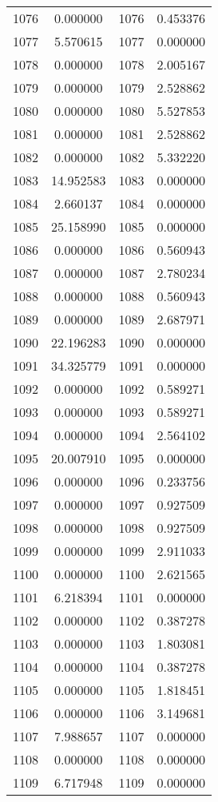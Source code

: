 \documentclass[12pt]{article}
\begin{document}
\begin{longtable}{@{}cccc@{}}
1076 & 0.000000 & 1076 & 0.453376 \\
1077 & 5.570615 & 1077 & 0.000000 \\
1078 & 0.000000 & 1078 & 2.005167 \\
1079 & 0.000000 & 1079 & 2.528862 \\
1080 & 0.000000 & 1080 & 5.527853 \\
1081 & 0.000000 & 1081 & 2.528862 \\
1082 & 0.000000 & 1082 & 5.332220 \\
1083 & 14.952583 & 1083 & 0.000000 \\
1084 & 2.660137 & 1084 & 0.000000 \\
1085 & 25.158990 & 1085 & 0.000000 \\
1086 & 0.000000 & 1086 & 0.560943 \\
1087 & 0.000000 & 1087 & 2.780234 \\
1088 & 0.000000 & 1088 & 0.560943 \\
1089 & 0.000000 & 1089 & 2.687971 \\
1090 & 22.196283 & 1090 & 0.000000 \\
1091 & 34.325779 & 1091 & 0.000000 \\
1092 & 0.000000 & 1092 & 0.589271 \\
1093 & 0.000000 & 1093 & 0.589271 \\
1094 & 0.000000 & 1094 & 2.564102 \\
1095 & 20.007910 & 1095 & 0.000000 \\
1096 & 0.000000 & 1096 & 0.233756 \\
1097 & 0.000000 & 1097 & 0.927509 \\
1098 & 0.000000 & 1098 & 0.927509 \\
1099 & 0.000000 & 1099 & 2.911033 \\
1100 & 0.000000 & 1100 & 2.621565 \\
1101 & 6.218394 & 1101 & 0.000000 \\
1102 & 0.000000 & 1102 & 0.387278 \\
1103 & 0.000000 & 1103 & 1.803081 \\
1104 & 0.000000 & 1104 & 0.387278 \\
1105 & 0.000000 & 1105 & 1.818451 \\
1106 & 0.000000 & 1106 & 3.149681 \\
1107 & 7.988657 & 1107 & 0.000000 \\
1108 & 0.000000 & 1108 & 0.000000 \\
1109 & 6.717948 & 1109 & 0.000000 \\

\end{longtable}
\end{document}
